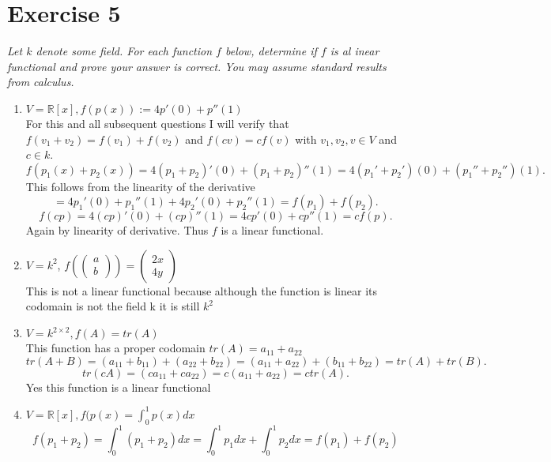\documentclass{article}
\begin{document}
    \section{Exercise 5}
    \emph{Let $k$ denote some field. For each function $f$ below, determine if $f$ is al inear functional and prove your answer is correct.
    You may assume standard results from calculus.}
    \begin{enumerate}
        \item $V = \mathbb{R}[x], f(p(x)) := 4p'(0) + p''(1)$ \\
            For this and all subsequent questions I will verify that $f(v_1+v_2) = f(v_1) +f(v_2)$ and $f(cv) = cf(v)$ with $v_1,v_2,v \in V$ and $c \in k$.
            \[
            f(p_1(x) + p_2(x)) = 4(p_1+p_2)'(0) + (p_1+p_2)''(1) = 4(p_1'+p_2')(0) +(p_1''+p_2'')(1)
            .\] 
            This follows from the linearity of the derivative
            \[
            = 4p_1'(0) + p_1''(1) + 4p_2'(0) + p_2''(1) = f(p_1) + f(p_2)
            .\] 
            \[
            f(cp) = 4(cp)'(0) + (cp)''(1) = 4cp'(0) + cp''(1) = cf(p)
            .\] 
            Again by linearity of derivative.
            Thus $f$ is a linear functional.
        \item $V = k^2$, $f( \left(\begin{array}{c} a \\ b \end{array}\right) ) = \left(\begin{array}{c} 2x \\ 4y \end{array}\right) $\\
            This is not a linear functional because although the function is linear its codomain is not the field k it is still $k^2$
        \item $V = k^{2 \times 2}, f(A) = tr(A)$\\
            This function has a proper codomain
            $tr(A) = a_{11}+a_{22}$\\
            \[
                tr(A+B) = (a_{11}+b_{11}) + (a_{22}+b_{22}) = (a_{11}+a_{22})+ (b_{11}+b_{22}) = tr(A) + tr(B)
            .\] 
            \[
            tr(cA) = (ca_{11}+ca_{22}) = c(a_{11}+a_{22}) = ctr(A)
            .\] 
            Yes this function is a linear functional
        \item $V = \mathbb{R} [x], f(p(x) = \int_{0}^{1}p(x)dx$ \\
            \[
            f(p_1+p_2) = \int_{0}^{1}(p_1+p_2)dx = \int_{0}^{1}p_1dx+\int_{0}^{1}p_2dx = f(p_1) + f(p_2)
\]
\end{enumerate}
\end{document}
